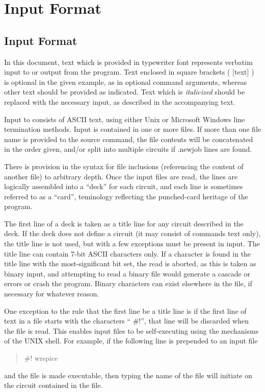 \chapter{{\WRspice} Input Format}


\section{Input Format}
\label{inputformat}

In this document, text which is provided in {\vt typewriter} font
represents verbatim input to or output from the program.  Text
enclosed in square brackets ( [text] ) is optional in the given
example, as in optional command arguments, whereas other text should
be provided as indicated.  Text which is {\it italicized} should be
replaced with the necessary input, as described in the accompanying
text.

Input to {\WRspice} consists of ASCII text, using either Unix or
Microsoft Windows line termination methods.  Input is contained in one
or more files.  If more than one file name is provided to the {\cb
source} command, the file contents will be concatenated in the order
given, and/or split into multiple circuits if {\vt .newjob} lines are
found.

There is provision in the syntax for file inclusions (referencing the
content of another file) to arbitrary depth.  Once the input files are
read, the lines are logically assembled into a ``deck'' for each
circuit, and each line is sometimes referred to as a ``card'',
teminology reflecting the punched-card heritage of the program.

The first line of a deck is taken as a title line for any circuit
described in the deck.  If the deck does not define a circuit (it may
consist of commands text only), the title line is not used, but with a
few exceptions must be present in input.  The title line can contain
7-bit ASCII characters only.  If a character is found in the title
line with the most-significant bit set, the read is aborted, as this
is taken as binary input, and attempting to read a binary file would
generate a cascade or errors or crash the program.  Binary characters
can exist elsewhere in the file, if necessary for whatever reason.

One exception to the rule that the first line be a title line is if
the first line of text in a file starts with the characters ``{\vt
\#!}'', that line will be discarded when the file is read.  This
enables {\WRspice} input files to be self-executing using the
mechanisms of the UNIX shell.  For example, if the following line is
prepended to an input file
\begin{quote}
{\vt \#! wrspice}
\end{quote}
and the file is made executable, then typing the name of the file will
initiate {\WRspice} on the circuit contained in the file.

